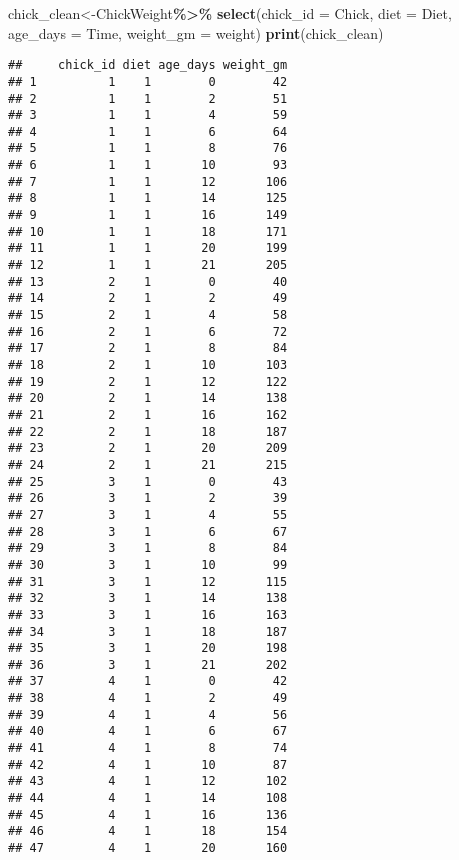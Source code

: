 \documentclass[
]{article}
\newenvironment{Shaded}{\begin{snugshade}}{\end{snugshade}}
\newcommand{\AttributeTok}[1]{\textcolor[rgb]{0.13,0.29,0.53}{#1}}
\newcommand{\FunctionTok}[1]{\textcolor[rgb]{0.13,0.29,0.53}{\textbf{#1}}}
\newcommand{\NormalTok}[1]{#1}
\newcommand{\OtherTok}[1]{\textcolor[rgb]{0.56,0.35,0.01}{#1}}
\newcommand{\SpecialCharTok}[1]{\textcolor[rgb]{0.81,0.36,0.00}{\textbf{#1}}}
\begin{document}
\begin{Shaded}
\begin{Highlighting}[]
\NormalTok{chick\_clean}\OtherTok{\textless{}{-}}\NormalTok{ChickWeight}\SpecialCharTok{\%\textgreater{}\%}
  \FunctionTok{select}\NormalTok{(}\AttributeTok{chick\_id =}\NormalTok{ Chick, }\AttributeTok{diet =}\NormalTok{ Diet, }\AttributeTok{age\_days =}\NormalTok{ Time, }\AttributeTok{weight\_gm =}\NormalTok{ weight)}
\FunctionTok{print}\NormalTok{(chick\_clean)}
\end{Highlighting}
\end{Shaded}

\begin{verbatim}
##     chick_id diet age_days weight_gm
## 1          1    1        0        42
## 2          1    1        2        51
## 3          1    1        4        59
## 4          1    1        6        64
## 5          1    1        8        76
## 6          1    1       10        93
## 7          1    1       12       106
## 8          1    1       14       125
## 9          1    1       16       149
## 10         1    1       18       171
## 11         1    1       20       199
## 12         1    1       21       205
## 13         2    1        0        40
## 14         2    1        2        49
## 15         2    1        4        58
## 16         2    1        6        72
## 17         2    1        8        84
## 18         2    1       10       103
## 19         2    1       12       122
## 20         2    1       14       138
## 21         2    1       16       162
## 22         2    1       18       187
## 23         2    1       20       209
## 24         2    1       21       215
## 25         3    1        0        43
## 26         3    1        2        39
## 27         3    1        4        55
## 28         3    1        6        67
## 29         3    1        8        84
## 30         3    1       10        99
## 31         3    1       12       115
## 32         3    1       14       138
## 33         3    1       16       163
## 34         3    1       18       187
## 35         3    1       20       198
## 36         3    1       21       202
## 37         4    1        0        42
## 38         4    1        2        49
## 39         4    1        4        56
## 40         4    1        6        67
## 41         4    1        8        74
## 42         4    1       10        87
## 43         4    1       12       102
## 44         4    1       14       108
## 45         4    1       16       136
## 46         4    1       18       154
## 47         4    1       20       160

\end{verbatim}
\end{document}
